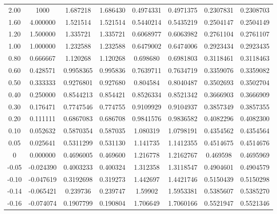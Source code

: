 \begin{threeparttable}
\begin{tabular}{S[table-format=-1.7] S[table-format=4.6] S[table-format=1.8] S[table-format=1.7] S[table-format=1.7] S[table-format=1.7] S[table-format=1.7] S[table-format=1.7]}
         2.00       &   1000\tnote{*}  &  1.687218   &  1.686430  &  0.4974331   &  0.4971375  &  0.2307831   &  0.2308703 \\
         1.60       &   4.000000  &  1.521514   &  1.521514  &  0.5440214   &  0.5435219  &  0.2504147   &  0.2504149 \\
         1.20       &   1.500000  &  1.335721   &  1.335721  &  0.6068977   &  0.6063982  &  0.2761104   &  0.2761107 \\
         1.00       &   1.000000  &  1.232588   &  1.232588  &  0.6479002   &  0.6474006  &  0.2923434   &  0.2923435 \\
         0.80       &   0.666667  &  1.120268   &  1.120268  &  0.698680   &  0.6981803  &  0.3118461   &  0.3118463 \\
         0.60       &   0.428571  &  0.9958365   &  0.995836  &  0.7639711   &  0.7634719  &  0.3359076   &  0.3359082 \\
         0.50       &   0.333333  &  0.9276801   &  0.927680  &  0.804584   &  0.8040487  &  0.3502693   &  0.3502704 \\
         0.40       &   0.250000  &  0.8544213   &  0.854421  &  0.8526334   &  0.8521342  &  0.3666903   &  0.3666909 \\
         0.30       &   0.176471  &  0.7747546   &  0.774755  &  0.9109929   &  0.9104937  &  0.3857349   &  0.3857355 \\
         0.20       &   0.111111  &  0.6867083   &  0.686708  &  0.9841576   &  0.9836582  &  0.4082296   &  0.4082300 \\
         0.10       &   0.052632  &  0.5870354   &  0.587035  &  1.080319   &  1.0798191  &  0.4354562   &  0.4354564 \\
         0.05       &   0.025641  &  0.5311299   &  0.531130  &  1.141735   &  1.1412355  &  0.4514675   &  0.4514676 \\
         0       &   0.000000  &  0.4696005   &  0.469600  &  1.216778   &  1.2162767  &  0.469598   &  0.4695969 \\
         -0.05       &   -0.024390  &  0.4003233   &  0.400324  &  1.312358   &  1.3118547  &  0.4904601   &  0.4904579 \\
         -0.10       &   -0.047619  &  0.3192698   &  0.319273  &  1.442697   &  1.4421746  &  0.5150439   &  0.5150298 \\
         -0.14       &   -0.065421  &  0.239736   &  0.239747  &  1.59902   &  1.5953381  &  0.5385607   &  0.5385270 \\
         -0.16       &   -0.074074  &  0.1907799   &  0.190804  &  1.706649   &  1.7060166  &  0.5521947   &  0.5521346 \\

\end{tabular}
\end{threeparttable}
